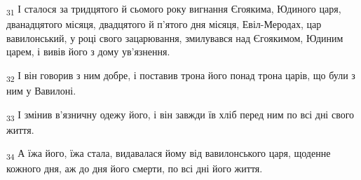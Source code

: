 \begin{tcolorbox}
\textsubscript{31} І сталося за тридцятого й сьомого року вигнання Єгоякима, Юдиного царя, дванадцятого місяця, двадцятого й п'ятого дня місяця, Евіл-Меродах, цар вавилонський, у році свого зацарювання, змилувався над Єгоякимом, Юдиним царем, і вивів його з дому ув'язнення.
\end{tcolorbox}
\begin{tcolorbox}
\textsubscript{32} І він говорив з ним добре, і поставив трона його понад трона царів, що були з ним у Вавилоні.
\end{tcolorbox}
\begin{tcolorbox}
\textsubscript{33} І змінив в'язничну одежу його, і він завжди їв хліб перед ним по всі дні свого життя.
\end{tcolorbox}
\begin{tcolorbox}
\textsubscript{34} А їжа його, їжа стала, видавалася йому від вавилонського царя, щоденне кожного дня, аж до дня його смерти, по всі дні його життя.
\end{tcolorbox}
